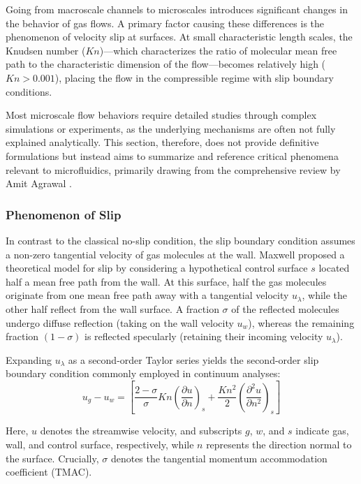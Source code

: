 Going from macroscale channels to microscales introduces significant changes in the behavior of gas flows.
A primary factor causing these differences is the phenomenon of velocity slip at surfaces.
At small characteristic length scales, the Knudsen number ($Kn$)—which characterizes the ratio of molecular mean free path to the characteristic dimension of the flow—becomes relatively high ($Kn > 0.001$), placing the flow in the compressible regime with slip boundary conditions.

Most microscale flow behaviors require detailed studies through complex simulations or experiments, as the underlying mechanisms are often not fully explained analytically.
This section, therefore, does not provide definitive formulations but instead aims to summarize and reference critical phenomena relevant to microfluidics, primarily drawing from the comprehensive review by Amit Agrawal \cite{agrawal_comprehensive_2011}.

\subsubsection*{Phenomenon of Slip}
	In contrast to the classical no-slip condition, the slip boundary condition assumes a non-zero tangential velocity of gas molecules at the wall.
	Maxwell proposed a theoretical model for slip by considering a hypothetical control surface $s$ located half a mean free path from the wall.
	At this surface, half the gas molecules originate from one mean free path away with a tangential velocity $u_\lambda$, while the other half reflect from the wall surface.
	A fraction $\sigma$ of the reflected molecules undergo diffuse reflection (taking on the wall velocity $u_w$), whereas the remaining fraction $(1 - \sigma)$ is reflected specularly (retaining their incoming velocity $u_\lambda$).

	Expanding $u_\lambda$ as a second-order Taylor series yields the second-order slip boundary condition commonly employed in continuum analyses:
	\begin{equation}
		u_g - u_w =
		\left[
			\frac{2-\sigma}{\sigma}Kn\left(\frac{\partial u}{\partial n}\right)_s
			+ \frac{Kn^2}{2} \left(\frac{\partial^2 u}{\partial n^2}\right)_s
		\right]
	\end{equation}

	Here, $u$ denotes the streamwise velocity, and subscripts $g$, $w$, and $s$ indicate gas, wall, and control surface, respectively, while $n$ represents the direction normal to the surface.
	Crucially, $\sigma$ denotes the tangential momentum accommodation coefficient (TMAC).

